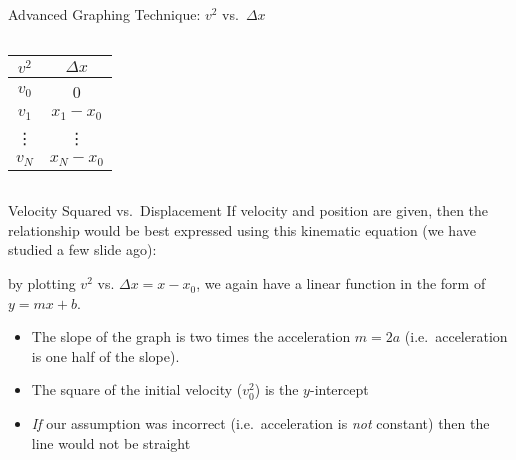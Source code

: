 \documentclass[12pt,compress,aspectratio=169,dvipsnames]{beamer}
\begin{document}
\begin{frame}{Advanced Graphing Technique: $v^2$ vs.\ $\Delta x$}
\begin{columns}[T]
{      \begin{tabular}{c|c}
        $v^2$ & $\Delta x$ \\\hline
        $v_0$ & 0 \\
        $v_1$ & $x_1-x_0$\\
        \vdots & \vdots \\
        $v_N$ & $x_N-x_0$
      \end{tabular}
      \hspace{.2in}
      \begin{minipage}{.4\textwidth}
      \end{minipage}
    }
  \end{columns}
\end{frame}



\begin{frame}{Velocity Squared vs.\ Displacement}
  If velocity and position are given, then the relationship would be best
  expressed using this kinematic equation (we have studied a few slide ago):


  by plotting $v^2$ vs. $\Delta x=x-x_0$, we again have a linear function in the
  form of $y=mx+b$.
  \begin{itemize}
  \item The slope of the graph is two times the acceleration $m=2a$ (i.e.\
    acceleration is one half of the slope).
  \item The square of the initial velocity ($v_0^2$) is the $y$-intercept
  \item \emph{If} our assumption was incorrect (i.e.\ acceleration is \emph{not}
    constant) then the line would not be straight
  \end{itemize}
\end{frame}
\end{document}

